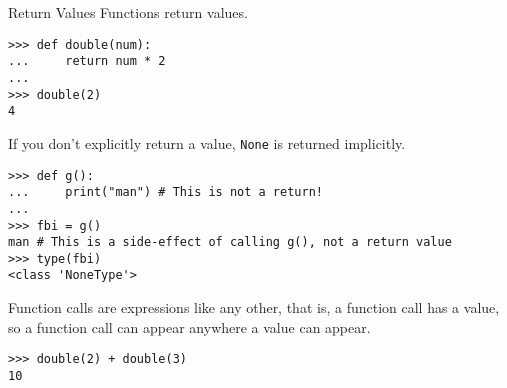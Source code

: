 \documentclass[smaller, aspectratio=1610]{beamer}
\begin{document}
\begin{frame}[label={sec:org3be8e48},fragile]{Return Values}
 Functions return values.

\lstset{language=Python,label= ,caption= ,captionpos=b,numbers=none}
\begin{lstlisting}
>>> def double(num):
...     return num * 2
...
>>> double(2)
4
\end{lstlisting}

If you don't explicitly return a value, \texttt{None} is returned implicitly.

\lstset{language=Python,label= ,caption= ,captionpos=b,numbers=none}
\begin{lstlisting}
>>> def g():
...     print("man") # This is not a return!
...
>>> fbi = g()
man # This is a side-effect of calling g(), not a return value
>>> type(fbi)
<class 'NoneType'>
\end{lstlisting}

Function calls are expressions like any other, that is, a function call has a value, so a function call can appear anywhere a value can appear.

\lstset{language=Python,label= ,caption= ,captionpos=b,numbers=none}
\begin{lstlisting}
>>> double(2) + double(3)
10
\end{lstlisting}
\end{frame}
\end{document}
